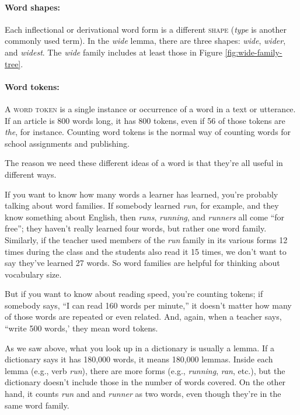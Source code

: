 \paragraph*{Word shapes:}Each inflectional or derivational word form is a different \textsc{shape} (\textit{type} is another commonly used term). In the \textit{wide} lemma, there are three shapes: \textit{wide}, \textit{wider}, and \textit{widest}. The \textit{wide} family includes at least those in Figure \ref{fig:wide-family-tree}.

\paragraph*{Word tokens:}A \textsc{word token} is a single instance or occurrence of a word in a text or utterance. If an article is 800 words long, it has 800 tokens, even if 56 of those tokens are \textit{the}, for instance. Counting word tokens is the normal way of counting words for school assignments and publishing.

The reason we need these different ideas of a word is that they're all useful in different ways. 

If you want to know how many words a learner has learned, you're probably talking about word families. If somebody learned \textit{run}, for example, and they know something about English, then \textit{runs}, \textit{running}, and \textit{runners} all come ``for free''; they haven't really learned four words, but rather one word family. Similarly, if the teacher used members of the \textit{run} family in its various forms 12 times during the class and the students also read it 15 times, we don't want to say they've learned 27 words. So word families are helpful for thinking about vocabulary size.

But if you want to know about reading speed, you're counting tokens; if somebody says, ``I can read 160 words per minute,''  it doesn't matter how many of those words are repeated or even related. And, again, when a teacher says, ``write 500 words,' they mean word tokens.

As we saw above, what you look up in a dictionary is usually a lemma. If a dictionary says it has 180,000 words, it means 180,000 lemmas. Inside each lemma (e.g., verb \textit{run}), there are more forms (e.g., \textit{running}, \textit{ran}, etc.), but the dictionary doesn't include those in the number of words covered. On the other hand, it counts \textit{run} and and \textit{runner} as two words, even though they're in the same word family.

